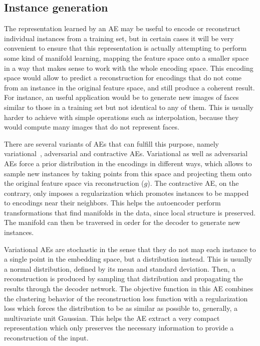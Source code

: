 \documentclass[
	fontsize=11pt, %
	twoside=false, %
	open=any, %
	secnumdepth=1, %
]{kaobook}
\begin{document}
\subsection{Instance generation}

The representation learned by an AE may be useful to encode or reconstruct individual instances from a training set, but in certain cases it will be very convenient to ensure that this representation is actually attempting to perform some kind of manifold learning, mapping the feature space onto a smaller space in a way that makes sense to work with the whole encoding space. This encoding space would allow to predict a reconstruction for encodings that do not come from an instance in the original feature space, and still produce a coherent result. For instance, an useful application would be to generate new images of faces similar to those in a training set but not identical to any of them. This is usually harder to achieve with simple operations such as interpolation, because they would compute many images that do not represent faces.

There are several variants of AEs that can fulfill this purpose, namely variational~\cite{variational}, adversarial and contractive AEs. Variational as well as adversarial AEs force a prior distribution in the encodings in different ways, which allows to sample new instances by taking points from this space and projecting them onto the original feature space via reconstruction ($g$). The contractive AE, on the contrary, only imposes a regularization which promotes instances to be mapped to encodings near their neighbors. This helps the autoencoder perform transformations that find manifolds in the data, since local structure is preserved. The manifold can then be traversed in order for the decoder to generate new instances.

Variational AEs are stochastic in the sense that they do not map each instance to a single point in the embedding space, but a distribution instead. This is usually a normal distribution, defined by its mean and standard deviation. Then, a reconstruction is produced by sampling that distribution and propagating the results through the decoder network. The objective function in this AE combines the clustering behavior of the reconstruction loss function with a regularization loss which forces the distribution to be as similar as possible to, generally, a multivariate unit Gaussian. This helps the AE extract a very compact representation which only preserves the necessary information to provide a reconstruction of the input.
\end{document}
